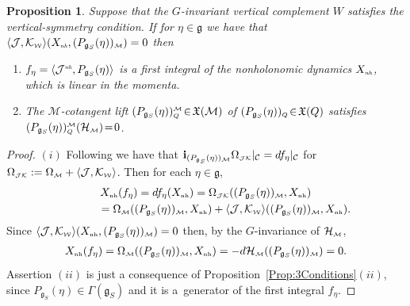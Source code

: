 \documentclass[10pt,a4paper]{amsart}
\numberwithin{equation}{section}
\newtheorem{Proposition}[Theorem]{Proposition}
 { \theoremstyle{definition}
\newtheorem{Definition}[Theorem]{Definition}
\newtheorem{Example}[Theorem]{Example}
\newtheorem{Remark}[Theorem]{Remark}
\newtheorem{Remarks}[Theorem]{Remarks} }
\def\W{\mathcal{W}}
\def\M{\mathcal{M}}
\def\J{\mathcal{J}}
\def\C{\mathcal{C}}
\def\Ham{\mathcal{H}}
\def\g{\mathfrak{g}}
\def\nh{{\mbox{\tiny{nh}}}}
\def\subW{{\mbox{\tiny{$\W$}}}}
\def\subM{{\mbox{\tiny{$\M$}}}}
\begin{document}
\begin{Proposition}\label{Prop:Conserved}
 Suppose that the $G$-invariant vertical complement $W$ satisfies the
 vertical-symmetry condition. If for $\eta\in \mathfrak{g}$ we have that
 $\langle \mathcal{J},\mathcal{K}_\subW\rangle (X_{\emph\nh},( P_{\mathfrak{g}_S}(\eta))_\subM )=0$
 then
 \begin{enumerate}\itemsep=0pt
  \item[$(i)$] $f_\eta = \langle \J^{\emph\nh}, P_{\mathfrak{g}_S}(\eta) \rangle$ is
  a first integral of the nonholonomic dynamics $X_{\emph\nh}$, which
  is linear in the momenta.
  \item[$(ii)$] The  $\M$-cotangent lift $( P_{\mathfrak{g}_S}(\eta))_{\mbox{\tiny{$Q$}}} ^{\subM} \!\in\! \mathfrak{X}(\M)$    of   $ (P_{\mathfrak{g}_S}(\eta))_{\mbox{\tiny{$Q$}}} \!\in\! \mathfrak{X}(Q)$
  satisfies $(P_{\mathfrak{g}_S}(\eta))_{\mbox{\tiny{$Q$}}} ^{\subM} (\Ham_\subM)\! =\! 0$.
 \end{enumerate}
\end{Proposition}



\begin{proof}
$(i)$ Following \cite[Theorem~6.5(ii)]{Paula} we have that
${\bf i}_{( P_{\mathfrak{g}_S}(\eta))_\subM} \Omega_{\mbox{\tiny{${\mathcal J} {\mathcal K}$}}} |_\C= df_\eta|_\C$  for  $\Omega_{\mbox{\tiny{${\mathcal J} {\mathcal K}$}}} := \Omega_\subM + \langle \mathcal{J},\mathcal{K}_\subW\rangle$.
Then for each $\eta \in \mathfrak{g}$,
\begin{gather*}
X_\nh (f_\eta) = df_\eta (X_\nh) = \Omega_{\mbox{\tiny{${\mathcal J} {\mathcal K}$}}}( (P_{\mathfrak{g}_S}(\eta) )_\subM , X_\nh) \\
\hphantom{X_\nh (f_\eta)}{} =  \Omega_\subM( (P_{\mathfrak{g}_S}(\eta) )_\subM , X_\nh) +  \langle \mathcal{J},\mathcal{K}_\subW\rangle ( (P_{\mathfrak{g}_S}(\eta) )_\subM , X_\nh ).
\end{gather*}
Since $\langle \mathcal{J},\mathcal{K}_\subW\rangle (X_{\nh},( P_{\mathfrak{g}_S}(\eta))_\subM ) = 0$ then,
by the $G$-invariance of $\Ham_\subM$,
\begin{gather*}
X_\nh (f_\eta) = \Omega_\subM((P_{\mathfrak{g}_S}(\eta) )_\subM,X_\nh) = - d\Ham_\subM ((P_{\mathfrak{g}_S}(\eta) )_\subM )=0.
\end{gather*}
Assertion $(ii)$ is just a consequence of Proposition~\ref{Prop:3Conditions}$(ii)$,
since $P_{\mathfrak{g}_S}(\eta)  \in \Gamma(\g_S)$ and it
is a~generator of the f\/irst integral $f_\eta$.
\end{proof}
\end{document}
